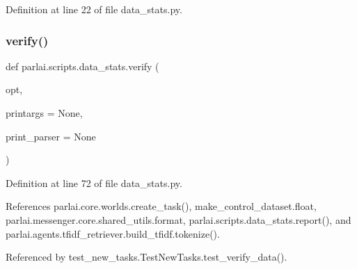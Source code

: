 Definition at line 22 of file data\+\_\+stats.\+py.

\mbox{\label{namespaceparlai_1_1scripts_1_1data__stats_a3bf0a490abe0b6ea608d1f9ece194c79}} 
\subsubsection{\texorpdfstring{verify()}{verify()}}
{\footnotesize\ttfamily def parlai.\+scripts.\+data\+\_\+stats.\+verify (\begin{DoxyParamCaption}\item[{}]{opt,  }\item[{}]{printargs = {\ttfamily None},  }\item[{}]{print\+\_\+parser = {\ttfamily None} }\end{DoxyParamCaption})}



Definition at line 72 of file data\+\_\+stats.\+py.



References parlai.\+core.\+worlds.\+create\+\_\+task(), make\+\_\+control\+\_\+dataset.\+float, parlai.\+messenger.\+core.\+shared\+\_\+utils.\+format, parlai.\+scripts.\+data\+\_\+stats.\+report(), and parlai.\+agents.\+tfidf\+\_\+retriever.\+build\+\_\+tfidf.\+tokenize().



Referenced by test\+\_\+new\+\_\+tasks.\+Test\+New\+Tasks.\+test\+\_\+verify\+\_\+data().

